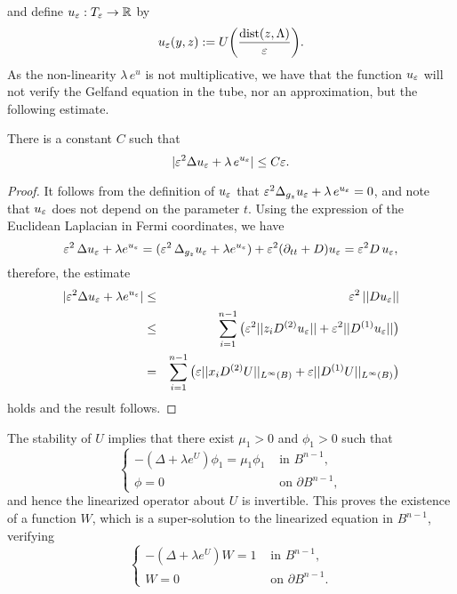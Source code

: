 \noindent and define $u_\varepsilon:T_\varepsilon\to \mathbb{R}$ by
\[
u_\varepsilon(y,z):=U\bigg(\frac{\mbox{dist}(z,\Lambda)}{\varepsilon}\bigg).
\]
As the non-linearity $\lambda\,e^u$ is not multiplicative, we have that the
function $u_\varepsilon$ will not verify the Gelfand equation in the tube, nor an
approximation, but the following estimate.

\begin{lemma}\label{lem-bound_Cepsilon} There is a constant $C$ such that
    \begin{equation}
        |\varepsilon^2\Delta u_\varepsilon+\lambda\, e^{u_\varepsilon}|\leq C\varepsilon.
    \end{equation}
\end{lemma}

\begin{proof} It follows from the definition of $u_\varepsilon$ that
    $\varepsilon^2\Delta_{g_z}u_\varepsilon + \lambda\, e^{u_\varepsilon}=0$, and note that $u_\varepsilon$ does not
    depend on the parameter $t$. Using the expression of the Euclidean Laplacian in
    Fermi coordinates, we have
    \[
        \varepsilon^2\, \Delta u_\varepsilon+\lambda e^{u_\varepsilon} = (\varepsilon^2\, \Delta_{g_z} u_\varepsilon +
        \lambda e^{u_\varepsilon})+\varepsilon^2(\partial_{tt}+D)u_\varepsilon = \varepsilon^2 D\, u_\varepsilon,
    \]
    therefore, the estimate
    \begin{eqnarray}
        |\varepsilon^2\Delta u_\varepsilon + \lambda e^{u_\varepsilon}|&\leq& \varepsilon^2\, ||Du_\varepsilon|| \\
                                               &\leq& \sum_{i=1}^{n-1} \big(\varepsilon^2||z_{i}D^{(2)}u_\varepsilon||+\varepsilon^2||D^{(1)}u_\varepsilon||\big)\\
                                               &=& \sum_{i=1}^{n-1}\big(\varepsilon
                                               ||x_{i}D^{(2)}U||_{L^\infty(B)}+\varepsilon||D^{(1)}U||_{L^\infty(B)}\big)
    \end{eqnarray}
    holds and the result follows.
\end{proof}
\medskip

The stability of $U$ implies that there exist $\mu_1>0$ and $\phi_1>0$ such that
\begin{equation}
    \left\{\begin{array}{cc}
            -(\Delta+\lambda e^U)\phi_1=\mu_1\phi_1 & \mbox{ in }B^{n-1},\\
            \phi=0 & \mbox{ on }\partial B^{n-1},
    \end{array}\right.
\end{equation}
and hence the linearized operator about $U$ is invertible. This proves the
existence of a function $W$, which is a super-solution to the linearized
equation in $B^{n-1}$, verifying
\begin{equation}
    \left\{\begin{array}{cc}
            -(\Delta+\lambda e^U)W=1 & \mbox{ in }B^{n-1},\\
            W=0 & \mbox{ on }\partial B^{n-1}.
    \end{array}\right.
\end{equation}

